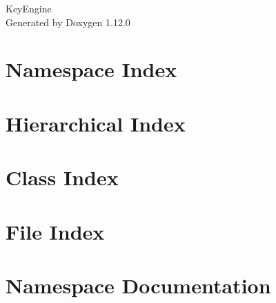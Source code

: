 \documentclass[twoside]{book}
\newcommand{\+}{\discretionary{\mbox{\scriptsize$\hookleftarrow$}}{}{}}
\newcommand{\clearemptydoublepage}{%
    \newpage{\pagestyle{empty}\cleardoublepage}%
  }
\begin{document}
  \raggedbottom
    \hypersetup{pageanchor=false,
                bookmarksnumbered=true,
                pdfencoding=unicode
               }
  \begin{titlepage}
  \vspace*{7cm}
  \begin{center}%
  {\Large Key\+Engine}\\
  \vspace*{1cm}
  {\large Generated by Doxygen 1.12.0}\\
  \end{center}
  \end{titlepage}
  \clearemptydoublepage
  \tableofcontents
  \clearemptydoublepage
  \hypersetup{pageanchor=true}
\chapter{Namespace Index}

\chapter{Hierarchical Index}

\chapter{Class Index}

\chapter{File Index}

\chapter{Namespace Documentation}


















\end{document}
